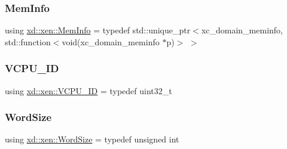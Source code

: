\mbox{\label{namespacexd_1_1xen_a34ff770013f1c25915f83aac337f2334}} 
\subsubsection{\texorpdfstring{Mem\+Info}{MemInfo}}
{\footnotesize\ttfamily using \mbox{\hyperlink{namespacexd_1_1xen_a34ff770013f1c25915f83aac337f2334}{xd\+::xen\+::\+Mem\+Info}} = typedef std\+::unique\+\_\+ptr$<$xc\+\_\+domain\+\_\+meminfo, std\+::function$<$void(xc\+\_\+domain\+\_\+meminfo $\ast$p)$>$ $>$}

\mbox{\label{namespacexd_1_1xen_ac71045dda8a7d9d6fd0d7643001bb14e}} 
\subsubsection{\texorpdfstring{V\+C\+P\+U\+\_\+\+ID}{VCPU\_ID}}
{\footnotesize\ttfamily using \mbox{\hyperlink{namespacexd_1_1xen_ac71045dda8a7d9d6fd0d7643001bb14e}{xd\+::xen\+::\+V\+C\+P\+U\+\_\+\+ID}} = typedef uint32\+\_\+t}

\mbox{\label{namespacexd_1_1xen_ab0ad6c1b122ad0b67c749ee5bae3cc1c}} 
\subsubsection{\texorpdfstring{Word\+Size}{WordSize}}
{\footnotesize\ttfamily using \mbox{\hyperlink{namespacexd_1_1xen_ab0ad6c1b122ad0b67c749ee5bae3cc1c}{xd\+::xen\+::\+Word\+Size}} = typedef unsigned int}

